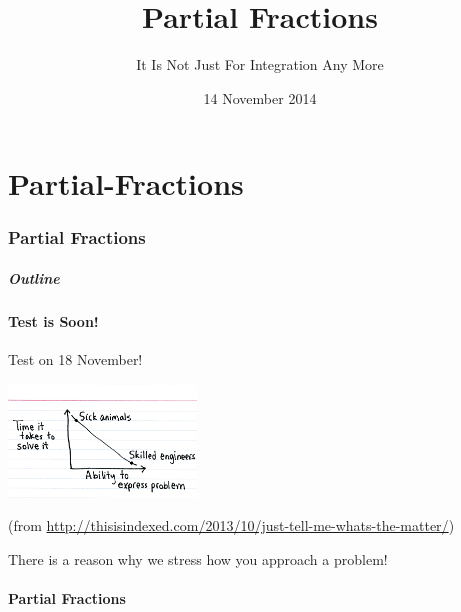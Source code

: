 \part{Partial-Fractions}
\section{Partial Fractions}


\title{Partial Fractions}
\subtitle{It Is Not Just For Integration Any More}
\date{14 November 2014}

\begin{frame}
  \titlepage
\end{frame}

\begin{frame}
  \frametitle{Outline}
  \tableofcontents[ currentsection ]
\end{frame}


\subsection{Test is Soon!}

\begin{frame}{Test on 18 November!}
  \centerline{\includegraphics[width=5cm]{img/skilledEngineers}}

  {\tiny
    (from
    \url{http://thisisindexed.com/2013/10/just-tell-me-whats-the-matter/})
  }

  There is a reason why we stress how you approach a problem!

\end{frame}
\subsection{Partial Fractions}


